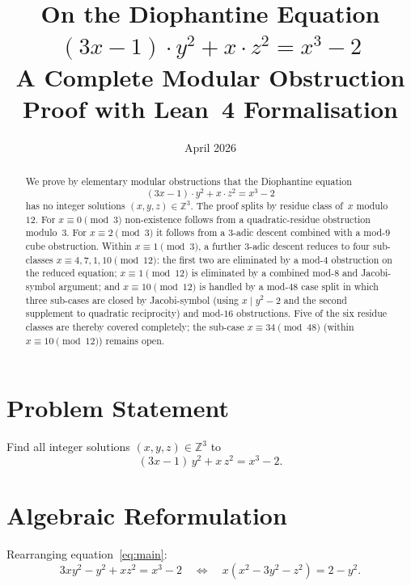 \documentclass[12pt,a4paper]{article}
\title{%
  \Large\bfseries On the Diophantine Equation\\[6pt]
  \Huge $(3x-1) \cdot y^2 + x\cdot z^2 = x^3 - 2$\\[10pt]
  \large A Complete Modular Obstruction Proof with Lean~4 Formalisation}
\author{}
\date{April 2026}
\theoremstyle{definition}
\newcommand{\Z}{\mathbb{Z}}
\begin{document}
\maketitle
\thispagestyle{fancy}

\begin{abstract}
We prove by elementary modular obstructions that the Diophantine equation
\[
  (3x-1)\cdot y^2 + x\cdot z^2 = x^3 - 2
\]
has no integer solutions $(x,y,z)\in\mathbb{Z}^3$.
The proof splits by residue class of~$x$ modulo~$12$.
For $x\equiv 0\pmod 3$ non-existence follows from a quadratic-residue
obstruction modulo~$3$.
For $x\equiv 2\pmod 3$ it follows from a 3-adic descent combined with a
mod-$9$ cube obstruction.
Within $x\equiv 1\pmod 3$, a further 3-adic descent reduces to four sub-classes
$x\equiv 4,7,1,10\pmod{12}$: the first two are eliminated by a mod-$4$
obstruction on the reduced equation; $x\equiv 1\pmod{12}$ is eliminated by a
combined mod-$8$ and Jacobi-symbol argument; and $x\equiv 10\pmod{12}$ is
handled by a mod-$48$ case split in which three sub-cases are closed by
Jacobi-symbol (using $x \mid y^2-2$ and the second supplement to quadratic
reciprocity) and mod-$16$ obstructions.
Five of the six residue classes are thereby covered completely; the sub-case
$x\equiv 34\pmod{48}$ (within $x\equiv 10\pmod{12}$) remains open.
\end{abstract}

\tableofcontents
\bigskip

\section{Problem Statement}

Find all integer solutions $(x, y, z) \in \Z^3$ to
\begin{equation}\label{eq:main}
  (3x-1)\,y^2 + x\,z^2 = x^3 - 2.
\end{equation}

\section{Algebraic Reformulation}

Rearranging equation~\eqref{eq:main}:
\[
  3xy^2 - y^2 + xz^2 = x^3 - 2
  \quad\Longleftrightarrow\quad
  x(x^2 - 3y^2 - z^2) = 2 - y^2.
\]
\end{document}
